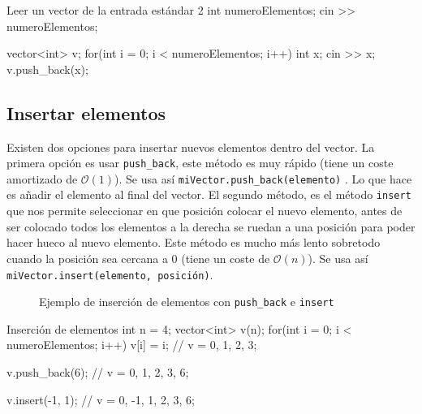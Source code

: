 \documentclass{article}
\begin{document}
    \begin{codelisting}{Leer un vector de la entrada estándar 2}
    int numeroElementos;
    cin >> numeroElementos;
    
    vector<int> v;
    for(int i = 0; i < numeroElementos; i++) {
        int x; 
        cin >> x; 
        v.push_back(x);
    }
    \end{codelisting}

    \subsection{Insertar elementos}

    Existen dos opciones para insertar nuevos elementos dentro del vector. La primera opción es usar \texttt{push\_back},
    este método es muy rápido (tiene un coste amortizado de $\mathcal{O}(1)$). Se usa así \texttt{miVector.push\_back(elemento)} . Lo que hace es añadir el elemento al final 
    del vector. El segundo método, es el método \texttt{insert} que nos permite seleccionar en que posición colocar el
    nuevo elemento, antes de ser colocado todos los elementos a la derecha se ruedan a una posición para poder hacer hueco
    al nuevo elemento. Este método es mucho más lento sobretodo cuando la posición sea cercana a 0 (tiene un coste de $\mathcal{O}(n)$). 
    Se usa así \texttt{miVector.insert(elemento, posición)}.

    \begin{figure}[h]
        \centering
        \caption{Ejemplo de inserción de elementos con \texttt{push\_back} e \texttt{insert}}
    \end{figure}

    \begin{codelisting}{Inserción de elementos}
int n = 4;        
vector<int> v(n);
for(int i = 0; i < numeroElementos; i++) {
    v[i] = i;
}
// v = {0, 1, 2, 3};

v.push_back(6); // v = {0, 1, 2, 3, 6};

v.insert(-1, 1); // v = {0, -1, 1, 2, 3, 6};
        \end{codelisting}
\end{document}
